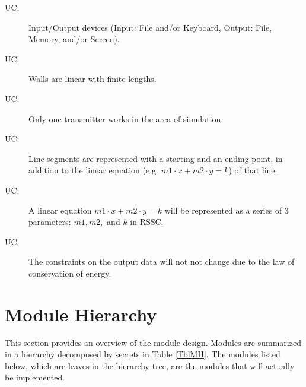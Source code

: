 \documentclass[12pt, titlepage]{article}
\newcounter{ucnum}
\newcommand{\uctheucnum}{UC\theucnum}
\begin{document}
\begin{description}
\item[ \uctheucnum \label{ucIO}:] Input/Output devices
  (Input: File and/or Keyboard, Output: File, Memory, and/or Screen).
\item[ \uctheucnum \label{ucWallShape}:] Walls are linear with finite lengths.
\item[ \uctheucnum \label{ucSingleSource}:] Only one transmitter works in the area of simulation.
\item[ \uctheucnum \label{ucSegment}:] Line segments are represented with a starting and an ending point, in addition to the linear equation (e.g. $m1\cdot x+m2\cdot y = k$) of that line.
\item[ \uctheucnum \label{ucEquation}:] A linear equation $m1\cdot x+m2\cdot y = k$ will be represented as a series of 3 parameters: $m1, m2,$ and $k$ in RSSC. 
\item[ \uctheucnum \label{ucOutputConstr}:] The constraints on the output data will not not change due to the law of conservation of energy. 
\end{description}

\section{Module Hierarchy} \label{SecMH}

This section provides an overview of the module design. Modules are summarized
in a hierarchy decomposed by secrets in Table \ref{TblMH}. The modules listed
below, which are leaves in the hierarchy tree, are the modules that will
actually be implemented.
\end{document}
